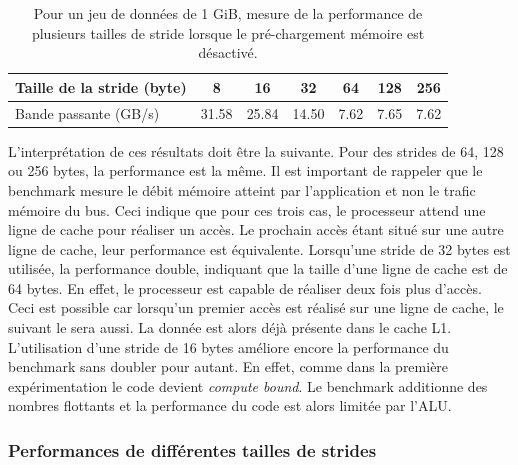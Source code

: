         \begin{table}[]
        \centering
        \begin{tabular}{|l|c|c|c|c|c|c|}
        \hline
        Taille de la stride (byte) & 8 & 16 & 32 & 64 & 128 & 256 \\ \hline
        Bande passante (GB/s) & 31.58 & 25.84 & 14.50 & 7.62 & 7.65 & 7.62 \\ \hline
        \end{tabular}%
        \caption{Pour un jeu de données de 1 GiB, mesure de la performance de plusieurs tailles de stride lorsque le pré-chargement mémoire est désactivé.}
        \label{tab:dml_cache_line}
        \end{table}
        
         L'interprétation de ces résultats doit être la suivante. Pour des strides de 64, 128 ou 256 bytes, la performance est la même. Il est important de rappeler que le benchmark mesure le débit mémoire atteint par l'application et non le trafic mémoire du bus. Ceci indique que pour ces trois cas, le processeur attend une ligne de cache pour réaliser un accès. Le prochain accès étant situé sur une autre ligne de cache, leur performance est équivalente. Lorsqu'une stride de 32 bytes est utilisée, la performance double, indiquant que la taille d'une ligne de cache est de 64 bytes. En effet, le processeur est capable de réaliser deux fois plus d'accès. Ceci est possible car lorsqu'un premier accès est réalisé sur une ligne de cache, le suivant le sera aussi. La donnée est alors déjà présente dans le cache L1. L'utilisation d'une stride de 16 bytes améliore encore la performance du benchmark sans doubler pour autant. En effet, comme dans la première expérimentation le code devient \textit{compute bound}. Le benchmark additionne des nombres flottants et la performance du code est alors limitée par l'ALU. 
    
    
    \subsubsection{Performances de différentes tailles de strides} \label{sec:dml_bad_stride}
        

